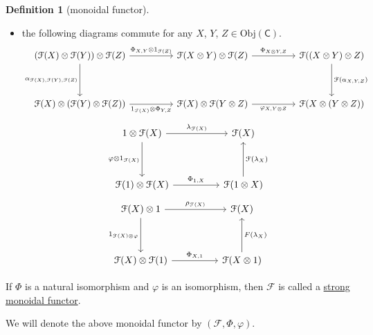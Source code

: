 \documentclass[a4paper]{report}
\newcommand{\defn}[1]{\ul{#1}}
\newcommand{\Obj}{\mathrm{Obj}}
\theoremstyle{definition}
\newtheorem{definition}{Definition}[section]
\theoremstyle{plain}
\theoremstyle{remark}
\begin{document}
\begin{definition}[monoidal functor]
\begin{itemize}
    \item the following diagrams commute for any $X$, $Y$, $Z \in \Obj(\mathsf{C})$.
      \begin{equation*}
        \begin{tikzcd}[row sep=huge, column sep=huge]
          (\mathcal{F}(X) \otimes \mathcal{F}(Y)) \otimes \mathcal{F}(Z)
          \arrow[r, "{\Phi_{X, Y} \otimes 1_{\mathcal{F}(Z)}}"]
          \arrow[d, swap, "\alpha_{\mathcal{F}(X), \mathcal{F}(Y), \mathcal{F}(Z)}"]
          & \mathcal{F}(X \otimes Y) \otimes \mathcal{F}(Z)
          \arrow[r, "{\Phi_{X \otimes Y, Z}}"]
          & \mathcal{F}((X \otimes Y) \otimes Z) 
          \arrow[d, "{\mathcal{F}(\alpha_{X, Y, Z})}"]
          \\
          \mathcal{F}(X) \otimes (\mathcal{F}(Y) \otimes \mathcal{F}(Z)) 
          \arrow[r, swap, "{1_{\mathcal{F}(X)} \otimes \Phi_{Y, Z}}"]
          & \mathcal{F}(X) \otimes \mathcal{F}(Y \otimes Z)
          \arrow[r, swap, "{\varphi_{X, Y \otimes Z}}"]
          & \mathcal{F}(X \otimes (Y \otimes Z))
        \end{tikzcd}
      \end{equation*}
      \begin{equation*}
        \begin{tikzcd}[row sep=huge, column sep=huge]
          1 \otimes \mathcal{F}(X)
          \arrow[r, "\lambda_{\mathcal{F}(X)}"]
          \arrow[d, swap, "\varphi \otimes 1_{\mathcal{F}(X)}"]
          & \mathcal{F}(X) 
          \\
          \mathcal{F}(1) \otimes \mathcal{F}(X)
          \arrow[r, "{\Phi_{1, X}}"]
          & \mathcal{F}(1 \otimes X)
          \arrow[u, swap, "\mathcal{F}(\lambda_{X})"]
        \end{tikzcd}
      \end{equation*}
      \begin{equation*}
        \begin{tikzcd}[row sep=huge, column sep=huge]
          \mathcal{F}(X) \otimes 1
          \arrow[r, "\rho_{\mathcal{F}(X)}"]
          \arrow[d, swap, "1_{\mathcal{F}(X)\otimes \varphi }"]
          & \mathcal{F}(X)
          \\
          \mathcal{F}(X) \otimes \mathcal{F}(1) 
          \arrow[r, "\Phi_{X, 1}"]
          & \mathcal{F}(X \otimes 1)
          \arrow[u, swap, "F(\lambda_{X})"]
        \end{tikzcd}
      \end{equation*}
  \end{itemize}

  If $\Phi$ is a natural isomorphism and $\varphi$ is an isomorphism, then $\mathcal{F}$ is called a \defn{strong monoidal functor}.

  We will denote the above monoidal functor by $(\mathcal{F}, \Phi, \varphi)$.
\end{definition}
\end{document}

